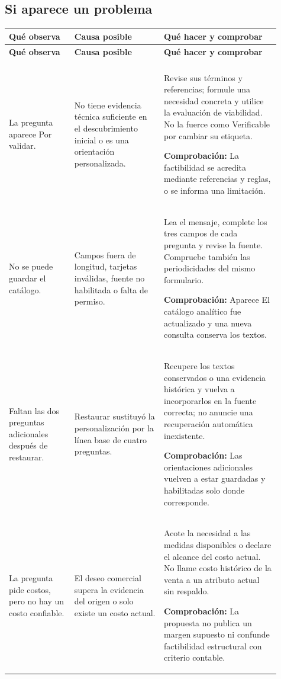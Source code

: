 \subsection{Si aparece un problema}
\begingroup
\fontsize{10}{12.5}\selectfont
\setlength{\tabcolsep}{5pt}
\renewcommand{\arraystretch}{1.15}
\begin{longtable}{@{}>{\RaggedRight\arraybackslash}p{0.22\linewidth}>{\RaggedRight\arraybackslash}p{0.3\linewidth}>{\RaggedRight\arraybackslash}p{0.39\linewidth}@{}}
\toprule
\textbf{Qué observa} & \textbf{Causa posible} & \textbf{Qué hacer y comprobar} \\
\midrule
\endfirsthead
\toprule
\textbf{Qué observa} & \textbf{Causa posible} & \textbf{Qué hacer y comprobar} \\
\midrule
\endhead
\midrule
\multicolumn{3}{r}{\footnotesize Continúa en la página siguiente}\\
\endfoot
\bottomrule
\endlastfoot
La pregunta aparece Por validar. & No tiene evidencia técnica suficiente en el descubrimiento inicial o es una orientación personalizada. & Revise sus términos y referencias; formule una necesidad concreta y utilice la evaluación de viabilidad. No la fuerce como Verificable por cambiar su etiqueta.\par\smallskip\textbf{Comprobación:} La factibilidad se acredita mediante referencias y reglas, o se informa una limitación. \\
\addlinespace[3pt]
No se puede guardar el catálogo. & Campos fuera de longitud, tarjetas inválidas, fuente no habilitada o falta de permiso. & Lea el mensaje, complete los tres campos de cada pregunta y revise la fuente. Compruebe también las periodicidades del mismo formulario.\par\smallskip\textbf{Comprobación:} Aparece El catálogo analítico fue actualizado y una nueva consulta conserva los textos. \\
\addlinespace[3pt]
Faltan las dos preguntas adicionales después de restaurar. & Restaurar sustituyó la personalización por la línea base de cuatro preguntas. & Recupere los textos conservados o una evidencia histórica y vuelva a incorporarlos en la fuente correcta; no anuncie una recuperación automática inexistente.\par\smallskip\textbf{Comprobación:} Las orientaciones adicionales vuelven a estar guardadas y habilitadas solo donde corresponde. \\
\addlinespace[3pt]
La pregunta pide costos, pero no hay un costo confiable. & El deseo comercial supera la evidencia del origen o solo existe un costo actual. & Acote la necesidad a las medidas disponibles o declare el alcance del costo actual. No llame costo histórico de la venta a un atributo actual sin respaldo.\par\smallskip\textbf{Comprobación:} La propuesta no publica un margen supuesto ni confunde factibilidad estructural con criterio contable. \\

\end{longtable}
